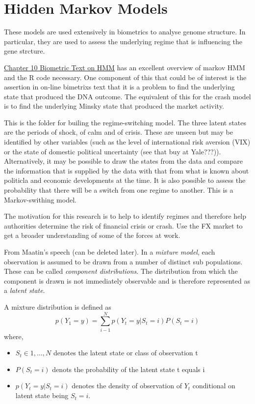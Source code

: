 \documentclass[12pt, a4paper, oneside]{article} %
\begin{document}
\section{Hidden Markov Models}
These models are used extensively in biometrics to analyse genome structure.  In particular, they are used to assess the underlying regime that is influencing the gene strcture. 

\href{http://a-little-book-of-r-for-bioinformatics.readthedocs.org/en/latest/src/chapter10.html}{Chapter 10 Biometric Text on HMM}
has an excellent overview of markov HMM and the R code necessary. One component of this that could be of interest is the assertion in on-line bimetrixs text that it is a problem to find the underlying state that produced the DNA outcome.  The equivalent of this for the crash model is to find the underlying Minsky state that produced the market activity. 

This is the folder for builing the regime-switching model. The three latent states are the periods of shock, of calm and of crisis.  These are unseen but may be identified by other variables (such as the level of international risk aversion (VIX) or the state of domestic political uncertainty (see that buy at Yale???)).  Alternatively, it may be possible to draw the states from the data and compare the information that is supplied by the data with that from what is known about politicla and economic developments at the time.  It is also possible to assess the probability that there will be a switch from one regime to another.  This is a Markov-swithing model. 

The motivation for this research is to help to identify regimes and therefore help authorities determine the risk of financial crisis or crash. Use the FX market to get a broader understanding of some of the forces at work.

From Maatin's speech (can be deleted later).  In a \emph{mixture model}, each observation is assumed to be drawn from a number of distinct sub populations.  These can be called \emph{component distributions}.  The distribution from which the component is drawn is not immediately observable and is therefore represented as a \emph{latent state}. 

A mixture distribution is defined as 
\begin{equation}
p(Y_1 = y) = \sum_{i - 1}^N p(Y_t = y|S_t = i)P(S_t = i)
\end{equation}
where,
\begin{itemize}
\item $S_t \in {1, \dots, N}$ denotes the latent state or class of observation t
\item $P(S_t = i)$ denots the probability of the latent state t equals i 
\item $p(Y_t = y|S_t = i)$ denotes the density of observation of $Y_t$ conditional on latent state being $S_t = i$.
\end{itemize}
\end{document}
